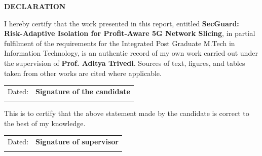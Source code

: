 \begin{center}{\Large\bfseries DECLARATION}\end{center}
\vspace{0.5cm}
\noindent I hereby certify that the work presented in this report, entitled \textbf{SecGuard: Risk-Adaptive Isolation for Profit-Aware 5G Network Slicing}, in partial fulfilment of the requirements for the Integrated Post Graduate M.Tech in Information Technology, is an authentic record of my own work carried out under the supervision of \textbf{Prof. Aditya Trivedi}. Sources of text, figures, and tables taken from other works are cited where applicable.

\vspace{1cm}
\begin{center}
\begin{tabular}{p{}p{}}
Dated: & \textbf{Signature of the candidate}\\
& \rule{0pt}{1cm}
\end{tabular}
\end{center}
\vspace{1.5cm}
\noindent This is to certify that the above statement made by the candidate is correct to the best of my knowledge.
\vspace{1.5cm}
\begin{center}
\begin{tabular}{p{}p{}}
Dated: & \textbf{Signature of supervisor}\\
& \rule{0pt}{1cm}
\end{tabular}
\end{center}
